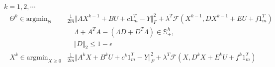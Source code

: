 \documentclass[letterpaper,10pt,english]{sphinxmanual}
\begin{document}
 \(k = 1, 2, \cdots\) 
\begin{equation*}
\begin{split}\begin{align}
    \Theta^k \in \text{argmin}_{\Theta} &\frac{1}{2m} \Vert AX^{k-1} + BU + c1_m^T - Y \Vert_F^2 + \lambda^T \mathcal{F}(X^{k-1},DX^{k-1} + EU + f1_m^T) \\
        &\quad \Lambda + A^TA - (\Lambda D + D^T \Lambda) \in \mathbb{S}_+^h, \\
        &\quad \Vert D \Vert_2 \leq 1 - \epsilon \\
    X^k \in \text{argmin}_{X \geq 0} &\frac{1}{2m}\Vert A^kX + B^kU + c^k1_m^T - Y \Vert_F^2 + \lambda^T \mathcal{F}(X,D^kX + E^kU + f^k1_m^T)
\end{align}\end{split}
\end{equation*}
\end{document}

